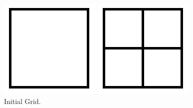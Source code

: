 \begin{figure}[tbp]
\centering
{}
  \includegraphics[width=\linewidth]{figures/grid_no_refinement.png}
  \caption{Initial Grid.}
\endminipage\hfill
{}
  \includegraphics[width=\linewidth]{figures/grid_first_refinement.png}

\end{figure}
